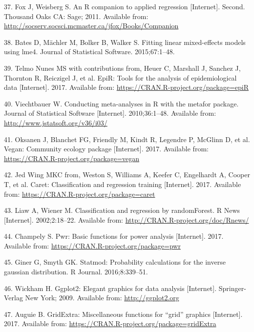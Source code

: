 \documentclass[12pt,]{article}
\begin{document}
\hypertarget{ref-car_citation_2011}{}
37. Fox J, Weisberg S. An R companion to applied regression
{[}Internet{]}. Second. Thousand Oaks CA: Sage; 2011. Available from:
\url{http://socserv.socsci.mcmaster.ca/jfox/Books/Companion}

\hypertarget{ref-lme4_citation_2015}{}
38. Bates D, Mächler M, Bolker B, Walker S. Fitting linear mixed-effects
models using lme4. Journal of Statistical Software. 2015;67:1--48.

\hypertarget{ref-epir_citation_2017}{}
39. Telmo Nunes MS with contributions from, Heuer C, Marshall J, Sanchez
J, Thornton R, Reiczigel J, et al. EpiR: Tools for the analysis of
epidemiological data {[}Internet{]}. 2017. Available from:
\url{https://CRAN.R-project.org/package=epiR}

\hypertarget{ref-metafor_citation_2010}{}
40. Viechtbauer W. Conducting meta-analyses in R with the metafor
package. Journal of Statistical Software {[}Internet{]}. 2010;36:1--48.
Available from: \url{http://www.jstatsoft.org/v36/i03/}

\hypertarget{ref-vegan_citation_2017}{}
41. Oksanen J, Blanchet FG, Friendly M, Kindt R, Legendre P, McGlinn D,
et al. Vegan: Community ecology package {[}Internet{]}. 2017. Available
from: \url{https://CRAN.R-project.org/package=vegan}

\hypertarget{ref-caret_citation_2017}{}
42. Jed Wing MKC from, Weston S, Williams A, Keefer C, Engelhardt A,
Cooper T, et al. Caret: Classification and regression training
{[}Internet{]}. 2017. Available from:
\url{https://CRAN.R-project.org/package=caret}

\hypertarget{ref-randomforest_citation_2002}{}
43. Liaw A, Wiener M. Classification and regression by randomForest. R
News {[}Internet{]}. 2002;2:18--22. Available from:
\url{http://CRAN.R-project.org/doc/Rnews/}

\hypertarget{ref-pwr_citation_2017}{}
44. Champely S. Pwr: Basic functions for power analysis {[}Internet{]}.
2017. Available from: \url{https://CRAN.R-project.org/package=pwr}

\hypertarget{ref-statmod_citation_2016}{}
45. Giner G, Smyth GK. Statmod: Probability calculations for the inverse
gaussian distribution. R Journal. 2016;8:339--51.

\hypertarget{ref-ggplot2_citation_2009}{}
46. Wickham H. Ggplot2: Elegant graphics for data analysis
{[}Internet{]}. Springer-Verlag New York; 2009. Available from:
\url{http://ggplot2.org}

\hypertarget{ref-gridextra_citation_2017}{}
47. Auguie B. GridExtra: Miscellaneous functions for ``grid'' graphics
{[}Internet{]}. 2017. Available from:
\url{https://CRAN.R-project.org/package=gridExtra}
\end{document}
